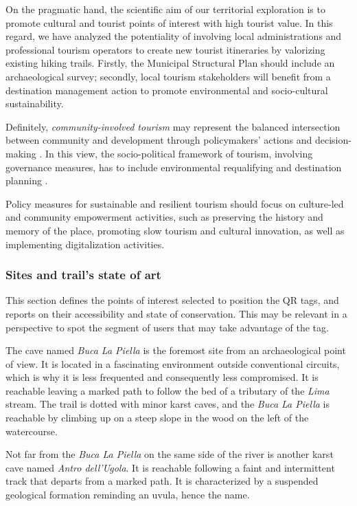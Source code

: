 \documentclass[sustainability,article,submit,pdftex,moreauthors]{Definitions/mdpi}
\begin{document}
On the pragmatic hand, the scientific aim of our territorial exploration is to promote cultural and tourist points of interest with high tourist value. 
In this regard, we have analyzed the potentiality of involving local administrations and professional tourism operators to create new tourist itineraries by valorizing existing hiking trails.
Firstly, the Municipal Structural Plan should include an archaeological survey; secondly, local tourism stakeholders will benefit from a destination management action to promote environmental and socio-cultural sustainability. 

Definitely, \textit{community-involved tourism} may represent the balanced intersection between community and development through policymakers' actions and decision-making \cite {jam14}.
In this view, the socio-political framework of tourism, involving governance measures, has to include environmental requalifying and destination planning \cite {ric03}. 

Policy measures for sustainable and resilient tourism should focus on culture-led and community empowerment activities, such as preserving the history and memory of the place, promoting slow tourism and cultural innovation, as well as implementing digitalization activities.

\subsubsection{Sites and trail’s state of art}

This section defines the points of interest selected to position the QR tags, and reports on their accessibility and state of conservation. This may be relevant in a perspective to spot the segment of users that may take advantage of the tag. 


The cave named {\em Buca La Piella} is the foremost site from an archaeological point of view. It is located in a fascinating environment outside conventional circuits, which is why it is less frequented and consequently less compromised. It is reachable leaving a marked path to follow the bed of a tributary of the \emph{Lima} stream. The trail is dotted with minor karst caves, and the {\em Buca La Piella} is reachable by climbing up on a steep slope in the wood on the left of the watercourse. 

Not far from the {\em Buca La Piella} on the same side of the river is another karst cave named {\em Antro dell'Ugola}. It is reachable following a faint and intermittent track that departs from a marked path. It is characterized by a suspended geological formation reminding an uvula, hence the name.
\end{document}
